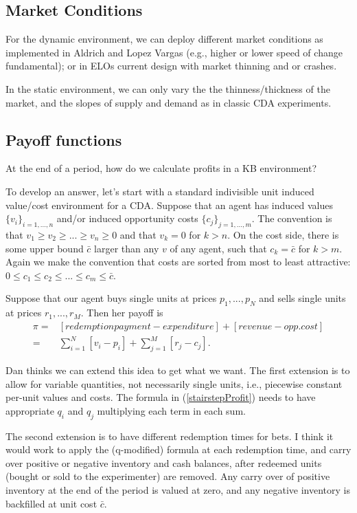 \documentclass{article}
\begin{document}
\subsection{Market Conditions}

For the dynamic environment, we can deploy different market conditions as implemented in Aldrich and Lopez Vargas (e.g., higher or lower speed of change fundamental); or in ELOs current design with market thinning and or crashes. 

In the static environment, we can only vary the the thinness/thickness of the market, and the slopes of supply and demand as in classic CDA experiments. 

\subsection{Payoff functions}
At the end of a period, how do we calculate profits in a KB environment? 

To develop an answer, let's start with a standard indivisible unit induced value/cost environment for a CDA. Suppose that an agent has induced values $\{v_i\}_{i=1, ...,n}$ and/or induced opportunity costs 
$\{c_j\}_{j=1, ...,m}$. The convention is that $v_1 \geq v_2 \geq ... \geq v_n \geq 0$ and that $v_k=0$ for $k>n$. On the cost side, there is some upper bound $\bar{c}$ larger than any $v$ of any agent, such that $c_k=\bar{c}$ for $k>m$.
Again we make the convention that costs are sorted from most to least attractive: $0 \leq c_1 \leq c_2 \leq ... \leq c_m \leq \bar{c}$.

Suppose that our agent buys single units at prices $p_1, ..., p_N$ and sells single units at prices $r_1, ..., r_M$. 
Then her payoff is
\begin{align} \nonumber
    \pi = & [redemption payment - expenditure] + [revenue - opp. cost]  \\ \label{stairstepProfit}
    = & \sum_{i=1}^N [v_i - p_i]  + \sum_{j=1}^M [r_j - c_j]. 
 \end{align}

Dan thinks we can extend this idea to get what we want. The first extension is to allow for variable quantities, not necessarily single units, i.e., piecewise constant per-unit values and costs. The formula in (\ref{stairstepProfit}) needs to have appropriate $q_i$ and $q_j$ multiplying each term in each sum. 

The second extension is to have different 
redemption times for bets. I think it would work to apply the (q-modified) formula 
at each redemption time, and carry over positive or negative inventory and cash balances, after redeemed units (bought or sold to the experimenter) are removed.
Any carry over of positive inventory at the end of the period is valued at zero, and any negative inventory is backfilled at unit cost $\bar{c}$.
\end{document}
